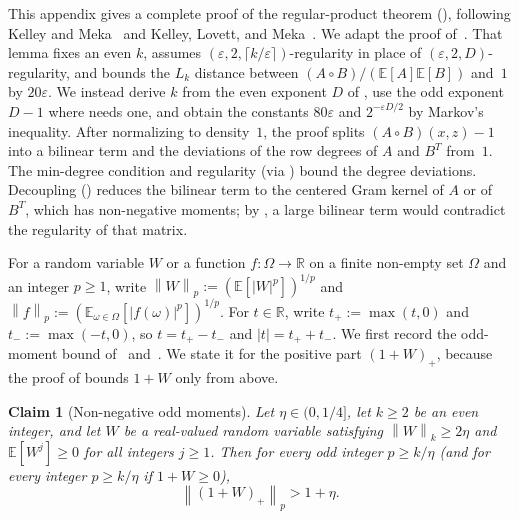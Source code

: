 \documentclass[11pt]{article}
\newtheorem{claim}[theorem]{Claim}
\theoremstyle{definition}
\renewcommand{\label}[1]{}%
\newcommand{\E}{\mathbb{E}}
\newcommand{\R}{\mathbb{R}}
\newcommand{\norm}[1]{\left\lVert #1 \right\rVert}
\newcommand{\abs}[1]{\left\lvert #1 \right\rvert}
\newcommand{\dens}[1]{\E[#1]}
\begin{document}
This appendix gives a complete proof of the regular-product theorem (), following Kelley and Meka~\cite[Propositions~2.14 \& 5.7]{KelleyM23} and Kelley, Lovett, and Meka~\cite[Claim~3.1 \& Section~4]{KelleyLM23}. We adapt the proof of~\cite[Lemma~4.8]{KelleyLM23}. That lemma fixes an even $k$, assumes $(\varepsilon, 2, \lceil k/\varepsilon \rceil)$-regularity in place of $(\varepsilon, 2, D)$-regularity, and bounds the $L_k$ distance between $(A \circ B)/(\dens{A}\dens{B})$ and~$1$ by $20\varepsilon$. We instead derive $k$ from the even exponent $D$ of , use the odd exponent $D - 1$ where  needs one, and obtain the constants $80\varepsilon$ and $2^{-\varepsilon D / 2}$ by Markov's inequality. After normalizing to density~$1$, the proof splits $(A \circ B)(x, z) - 1$ into a bilinear term and the deviations of the row degrees of $A$ and $B^T$ from~$1$. The min-degree condition and regularity (via ) bound the degree deviations. Decoupling () reduces the bilinear term to the centered Gram kernel of $A$ or of $B^T$, which has non-negative moments; by , a large bilinear term would contradict the regularity of that matrix.

For a random variable $W$ or a function $f : \Omega \to \R$ on a finite non-empty set $\Omega$ and an integer $p \ge 1$, write $\norm{W}_p := (\E[\abs{W}^p])^{1/p}$ and $\norm{f}_p := (\E_{\omega \in \Omega}[\abs{f(\omega)}^p])^{1/p}$. For $t \in \R$, write $t_+ := \max(t, 0)$ and $t_- := \max(-t, 0)$, so $t = t_+ - t_-$ and $\abs{t} = t_+ + t_-$. We first record the odd-moment bound of~\cite[Propositions~2.14 \& 5.7]{KelleyM23} and~\cite[Claim~3.1]{KelleyLM23}. We state it for the positive part $(1 + W)_+$, because the proof of  bounds $1 + W$ only from above.

\begin{claim}[Non-negative odd moments]
\label{clm:odd-moments}
Let $\eta \in (0, 1/4]$, let $k \ge 2$ be an even integer, and let $W$ be a real-valued random variable satisfying $\norm{W}_k \ge 2\eta$ and $\E[W^j] \ge 0$ for all integers $j \ge 1$. Then for every odd integer $p \ge k/\eta$ (and for every integer $p \ge k/\eta$ if $1 + W \ge 0$),
\[
    \norm{(1 + W)_+}_p > 1 + \eta.
\]
\end{claim}
\end{document}
